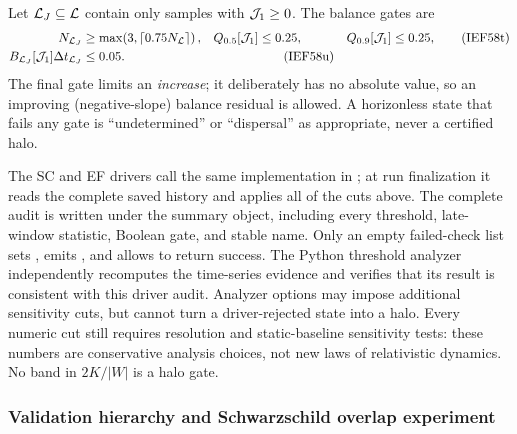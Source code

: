 Let \({\cal L}_J\subseteq{\cal L}\) contain only samples with
\({\cal J}_1\ge0\).  The balance gates are
\begin{align}
 N_{{\cal L}_J}&\ge
 \max\!\left(3,\left\lceil0.75N_{\cal L}\right\rceil\right),&
 Q_{0.5}[{\cal J}_1]&\le0.25,&
 Q_{0.9}[{\cal J}_1]&\le0.25,                         \tag{IEF58t}\\
 B_{{\cal L}_J}[{\cal J}_1]\Delta t_{{\cal L}_J}&\le0.05.&&
                                                               \tag{IEF58u}
\end{align}
The final gate limits an \emph{increase}; it deliberately has no absolute
value, so an improving (negative-slope) balance residual is allowed.  A
horizonless state that fails any gate is ``undetermined'' or ``dispersal'' as
appropriate, never a certified halo.

The SC and EF drivers call the same implementation in
; at run
finalization it reads the complete saved history and applies all of the cuts
above.  The complete audit is written under the
 summary object, including every
threshold, late-window statistic, Boolean gate, and stable
 name.  Only an empty failed-check list sets
, emits , and allows
 to return success.  The Python threshold
analyzer independently recomputes the time-series evidence and verifies that
its result is consistent with this driver audit.  Analyzer options may impose
additional sensitivity cuts, but cannot turn a driver-rejected state into a
halo.  Every numeric cut still requires resolution and static-baseline
sensitivity tests: these numbers are conservative analysis choices, not new
laws of relativistic dynamics.  No band in \(2K/|W|\) is a halo gate.

\subsubsection{Validation hierarchy and Schwarzschild overlap experiment}

